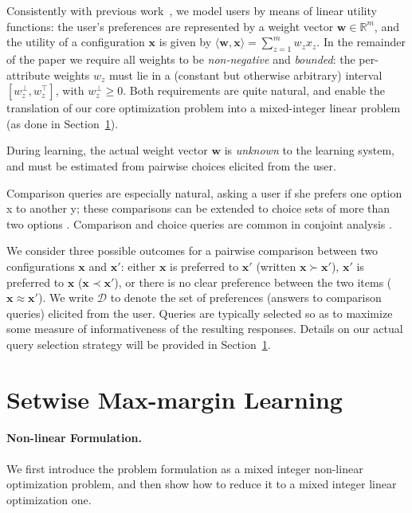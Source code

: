 \documentclass{article}
\renewcommand\[{\begin{equation}}
\renewcommand\]{\end{equation}}
\newcommand{\bbR}{\mathbb{R}}
\newcommand{\calvar}[1]{\ensuremath{\mathcal{#1}}}
\newcommand{\calD}{\calvar{D}}
\newcommand{\vecvar}[1]{\ensuremath{\boldsymbol{#1}}}
\newcommand{\vw}{\vecvar{w}}
\newcommand{\vx}{\vecvar{x}}
\newcommand{\andrea}[1]{{\bf \textcolor{blue}{{\fbox{Andrea:} #1}}}}
\begin{document}
Consistently with previous work~\cite{guo2010real,viappiani2010optimal}, we model users by means
of linear utility functions: the user's preferences are represented by a weight
vector $\vw\in\bbR^m$, and the utility of a configuration $\vx$ is given by
$\langle \vw, \vx \rangle = \sum_{z=1}^m w_z x_z$. In the remainder of the paper we
require all weights to be {\em non-negative} and {\em bounded}: the per-attribute
weights $w_z$ must lie in a (constant but otherwise arbitrary) interval
$[w^\bot_z, w^\top_z]$, with $w^\bot_z \ge 0$. Both requirements are quite
natural, and enable the translation of our core optimization problem into a
mixed-integer linear problem (as done in Section~\ref{sec:formulation}).

During learning, the actual weight vector $\vw$ is {\em unknown} to the
learning system, and must be estimated from pairwise choices elicited from the
user.

Comparison queries are especially natural, asking a user if she prefers one option x to another y;
these comparisons can be extended to choice sets of more than two options \cite{viappiani2009,viappiani2010optimal}.
Comparison and choice queries are common in conjoint analysis \cite{louviere2000,toubia2004}.


We consider three possible outcomes for a pairwise comparison between
two configurations $\vx$ and $\vx'$: either $\vx$ is preferred to $\vx'$ (written
$\vx \succ \vx'$), $\vx'$ is preferred to $\vx$ ($\vx \prec \vx'$), or there is
no clear preference between the two items ($\vx \approx \vx'$). We write
$\calD$ to denote the set of preferences (answers to comparison queries) 
elicited from the user. Queries are typically selected so as to maximize 
some measure of informativeness of the
resulting responses.  Details on our actual query selection strategy will be
provided in Section~\ref{sec:formulation}.

\section{Setwise Max-margin Learning}
\label{sec:formulation}

\paragraph{Non-linear Formulation.} We first introduce the problem
formulation as a mixed integer non-linear optimization problem, and
then show how to reduce it to a mixed integer linear optimization one.
\end{document}
